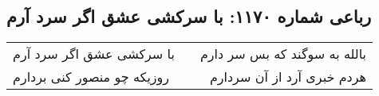 \begin{center}
\section*{رباعی شماره ۱۱۷۰: با سرکشی عشق اگر سرد آرم}
\label{sec:1170}
\begin{longtable}{l p{0.5cm} r}
با سرکشی عشق اگر سرد آرم
&&
بالله به سوگند که بس سر دارم
\\
روزیکه چو منصور کنی بردارم
&&
هردم خبری آرد از آن سردارم
\\
\end{longtable}
\end{center}
